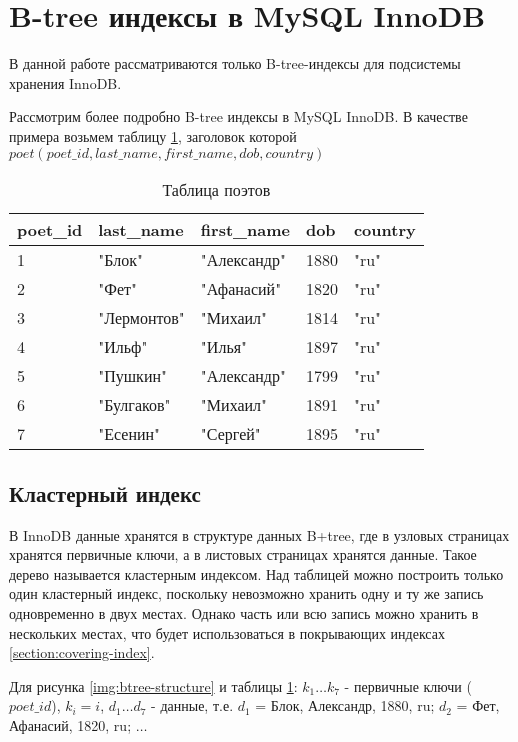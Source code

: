\section{B-tree индексы в MySQL InnoDB}
\label{section:b-tree-indexes-innodb}

В данной работе рассматриваются только B-tree-индексы для подсистемы хранения InnoDB.

Рассмотрим более подробно B-tree индексы в MySQL InnoDB. В качестве примера возьмем таблицу \ref{tabular:poets}, заголовок которой $poet (poet\_id, last\_name, first\_name, dob, country)$

\begin{table}[h]
\caption{Таблица поэтов}
\label{tabular:poets}
\medskip
\begin{tabular}{|l|l|l|l|l|}
\hline
poet\_id & last\_name & first\_name & dob & country\\
\hline
1 & "Блок" & "Александр" & 1880 & "ru"\\
2 & "Фет" & "Афанасий" & 1820 & "ru"\\
3 & "Лермонтов" & "Михаил" & 1814 & "ru"\\
4 & "Ильф" & "Илья" & 1897 & "ru"\\
5 & "Пушкин" & "Александр" & 1799 & "ru"\\
6 & "Булгаков" & "Михаил" & 1891 & "ru"\\
7 & "Есенин" & "Сергей" & 1895 & "ru"\\
\hline
\end{tabular}
\end{table}

\subsection{Кластерный индекс}

В InnoDB данные хранятся в структуре данных B+tree, где в узловых страницах хранятся первичные ключи, а в листовых страницах хранятся данные. Такое дерево называется кластерным индексом. Над таблицей можно построить только один кластерный индекс, поскольку невозможно хранить одну и ту же запись одновременно в двух местах. Однако часть или всю запись можно хранить в нескольких местах, что будет использоваться в покрывающих индексах \ref{section:covering-index}.

Для рисунка \ref{img:btree-structure} и таблицы \ref{tabular:poets}: $k_1 \ldots k_7$ - первичные ключи ($poet\_id$), $k_i = i$, $d_1 \ldots d_7$ - данные, т.е. $d_1$ = Блок, Александр, 1880, ru; $d_2$ = Фет, Афанасий, 1820, ru; $\ldots$



